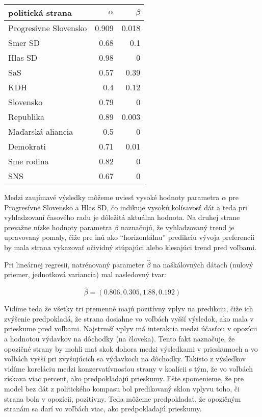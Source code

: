 \documentclass[report.tex]{subfiles}
\begin{document}
\vspace{0.5cm}
\begin{center}
\begin{tabular}{lrr}
	\toprule
	politická strana &  $\alpha$ & $\beta$ \\
	\midrule
	Progresívne Slovensko & 0.909 & 0.018 \\
	Smer SD & 0.68 & 0.1 \\
	Hlas SD & 0.98 & 0 \\
	SaS & 0.57 &  0.39 \\
	KDH & 0.4 & 0.12 \\
	Slovensko & 0.79 & 0 \\
	Republika & 0.89 & 0.003 \\
	Maďarská aliancia & 0.5 & 0 \\
	Demokrati & 0.71 & 0.01 \\
	Sme rodina & 0.82 & 0 \\
	SNS & 0.67 & 0 \\
	\bottomrule
\end{tabular}
\end{center}
\vspace{0.5cm}

Medzi zaujímavé výsledky môžeme uviesť vysoké hodnoty parametra $\alpha$ pre Progresívne Slovensko a Hlas SD, čo indikuje vysokú kolísavosť dát a teda pri vyhladzovaní časového radu je dôležitá aktuálna hodnota. Na druhej strane prevažne nízke hodnoty parametra $\beta$ naznačujú, že vyhladzovaný trend je upravovaný pomaly, čiže pre inú ako \enquote{horizontálnu} predikciu vývoja preferencií by mala strana vykazovať očividný stúpajúci alebo klesajúci trend pred voľbami.

Pri lineárnej regresii, natrénovaný parameter $\hat{\beta}$ na naškálovných dátach (nulový priemer, jednotková variancia) mal nasledovný tvar:

\begin{equation*}
	\hat{\beta} = (0.806, 0.305, 1.88, 0.192)
\end{equation*}

Vidíme teda že všetky tri premenné majú pozitívny vplyv na predikciu, čiže ich zvýšenie predpokladá, že strana dosiahne vo voľbách vyšší výsledok, ako mala v prieskume pred voľbami. Najstrmší vplyv má interakcia medzi účasťou v opozícii a hodnotou výdavkov na dôchodky (na človeka). Tento fakt naznačuje, že opozičné strany by mohli mať skok dohora medzi výsledkami v prieskumoch a vo voľbách vyšší pri zvyšujúcich sa výdavkoch na dôchodky. Takisto z výsledkov vidíme koreláciu medzi konzervatívnosťou strany v koalícii s tým, že vo voľbách získava viac percent, ako predpokladajú prieskumy. Ešte spomenieme, že pre model bez dát z politického kompasu bol predikovaný sklon vplyvu toho, či strana bola v opozícii, pozitívny. Teda môžeme predpokladať, že opozičným stranám sa darí vo voľbách viac, ako predpokladajú prieskumy.
\end{document}

